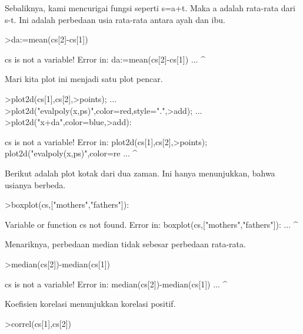 \documentclass[a4paper,10pt]{article}
\begin{document}
\begin{eulernotebook}
\begin{eulercomment}
\begin{eulercomment}
\begin{eulercomment}
\begin{eulercomment}
\begin{eulercomment}
\begin{eulercomment}
\begin{eulercomment}
\begin{eulercomment}
\begin{eulercomment}
\begin{eulercomment}
\begin{eulercomment}
\begin{eulercomment}
\begin{eulercomment}
\begin{eulercomment}
\begin{eulercomment}
\begin{eulercomment}
\begin{eulercomment}
\begin{eulercomment}
\begin{eulercomment}
Sebaliknya, kami mencurigai fungsi seperti s=a+t. Maka a adalah
rata-rata dari s-t. Ini adalah perbedaan usia rata-rata antara ayah
dan ibu.
\end{eulercomment}
\begin{eulerprompt}
>da:=mean(cs[2]-cs[1])
\end{eulerprompt}
\begin{euleroutput}
  cs is not a variable!
  Error in:
  da:=mean(cs[2]-cs[1]) ...
                ^
\end{euleroutput}
\begin{eulercomment}
Mari kita plot ini menjadi satu plot pencar.
\end{eulercomment}
\begin{eulerprompt}
>plot2d(cs[1],cs[2],>points);  ...
>plot2d("evalpoly(x,ps)",color=red,style=".",>add);  ...
>plot2d("x+da",color=blue,>add):
\end{eulerprompt}
\begin{euleroutput}
  cs is not a variable!
  Error in:
  plot2d(cs[1],cs[2],>points);  plot2d("evalpoly(x,ps)",color=re ...
              ^
\end{euleroutput}
\begin{eulercomment}
Berikut adalah plot kotak dari dua zaman. Ini hanya menunjukkan, bahwa
usianya berbeda.
\end{eulercomment}
\begin{eulerprompt}
>boxplot(cs,["mothers","fathers"]):
\end{eulerprompt}
\begin{euleroutput}
  Variable or function cs not found.
  Error in:
  boxplot(cs,["mothers","fathers"]): ...
            ^
\end{euleroutput}
\begin{eulercomment}
Menariknya, perbedaan median tidak sebesar perbedaan rata-rata.
\end{eulercomment}
\begin{eulerprompt}
>median(cs[2])-median(cs[1])
\end{eulerprompt}
\begin{euleroutput}
  cs is not a variable!
  Error in:
  median(cs[2])-median(cs[1]) ...
              ^
\end{euleroutput}
\begin{eulercomment}
Koefisien korelasi menunjukkan korelasi positif.
\end{eulercomment}
\begin{eulerprompt}
>correl(cs[1],cs[2])
\end{eulerprompt}

\end{eulercomment}
\end{eulercomment}
\end{eulercomment}
\end{eulercomment}
\end{eulercomment}
\end{eulercomment}
\end{eulercomment}
\end{eulercomment}
\end{eulercomment}
\end{eulercomment}
\end{eulercomment}
\end{eulercomment}
\end{eulercomment}
\end{eulercomment}
\end{eulercomment}
\end{eulercomment}
\end{eulercomment}
\end{eulercomment}
\end{eulernotebook}
\end{document}
